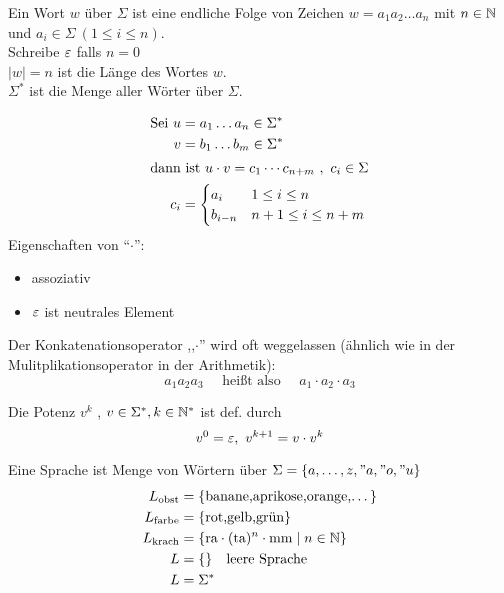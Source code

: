 \begin{Def}[name={[Wort $w$ über $\Sigma$]}]\label{def:1.2}
	Ein Wort $w$ über $\Sigma$ ist eine endliche Folge von Zeichen $w=a_1a_2\dots a_n$ mit $n\in\mathbb{N}$ und $a_i\in\Sigma\ (1\leq i\leq n)$.\\
	Schreibe $\varepsilon$ falls $n=0$\\
	$|w|=n$ ist die Länge des Wortes $w$.\\
	$\Sigma^*$ ist die Menge aller Wörter über $\Sigma$.
\end{Def}
\begin{Def}
	\begin{align*}
		\text{Sei }u &= a_1\dots a_n\in\Sigma^*\\
		v &= b_1\dots b_m\in\Sigma^*\\
		\shortintertext{dann ist $u\cdot v=c_1\cdots c_{n+m}\ ,\ c_i \in \Sigma$}
		c_i &= \begin{cases}
		a_i & 1\leq i\leq n\\
		b_{i-n} & n+1\leq i\leq n+m
		\end{cases}
	\end{align*}
	Eigenschaften von "`$\cdot$"':
	\begin{itemize}
		\item assoziativ
		\item $\varepsilon$ ist neutrales Element
	\end{itemize}
  Der Konkatenationsoperator ,,$\cdot$'' wird oft weggelassen (ähnlich wie in der Mulitplikationsoperator in der Arithmetik):
  \begin{displaymath}
    a_1a_2a_3 \quad \text{ heißt also } \quad a_1\cdot a_2\cdot a_3
  \end{displaymath}
  
	Die Potenz $v^k$ , $v\in \Sigma^*,k\in\mathbb{N}^*$ ist def. durch
	\[ v^0=\varepsilon,\ v^{k+1}=v\cdot v^k \]
\end{Def}
%
Eine Sprache ist Menge von Wörtern über $\Sigma=\{a,\dots,z,"a,"o,"u\}$
\begin{align*}
	L_\text{obst} &= \{\text{banane,aprikose,orange,\dots}\}\\
	L_\text{farbe} &= \{\text{rot,gelb,grün}\}\\
	L_\text{krach} &= \{\text{ra}\cdot(\text{ta})^n\cdot\text{mm} \mid n\in\mathbb{N} \}\\
	L &= \{\} \quad\text{leere Sprache}\\
	L &= \Sigma^*
\end{align*}

